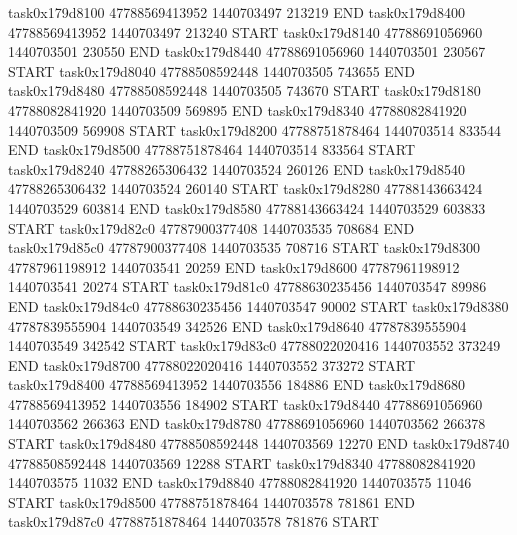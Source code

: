 task0x179d8100 47788569413952          1440703497               213219  END
task0x179d8400 47788569413952          1440703497               213240  START
task0x179d8140 47788691056960          1440703501               230550  END
task0x179d8440 47788691056960          1440703501               230567  START
task0x179d8040 47788508592448          1440703505               743655  END
task0x179d8480 47788508592448          1440703505               743670  START
task0x179d8180 47788082841920          1440703509               569895  END
task0x179d8340 47788082841920          1440703509               569908  START
task0x179d8200 47788751878464          1440703514               833544  END
task0x179d8500 47788751878464          1440703514               833564  START
task0x179d8240 47788265306432          1440703524               260126  END
task0x179d8540 47788265306432          1440703524               260140  START
task0x179d8280 47788143663424          1440703529               603814  END
task0x179d8580 47788143663424          1440703529               603833  START
task0x179d82c0 47787900377408          1440703535               708684  END
task0x179d85c0 47787900377408          1440703535               708716  START
task0x179d8300 47787961198912          1440703541                20259  END
task0x179d8600 47787961198912          1440703541                20274  START
task0x179d81c0 47788630235456          1440703547                89986  END
task0x179d84c0 47788630235456          1440703547                90002  START
task0x179d8380 47787839555904          1440703549               342526  END
task0x179d8640 47787839555904          1440703549               342542  START
task0x179d83c0 47788022020416          1440703552               373249  END
task0x179d8700 47788022020416          1440703552               373272  START
task0x179d8400 47788569413952          1440703556               184886  END
task0x179d8680 47788569413952          1440703556               184902  START
task0x179d8440 47788691056960          1440703562               266363  END
task0x179d8780 47788691056960          1440703562               266378  START
task0x179d8480 47788508592448          1440703569                12270  END
task0x179d8740 47788508592448          1440703569                12288  START
task0x179d8340 47788082841920          1440703575                11032  END
task0x179d8840 47788082841920          1440703575                11046  START
task0x179d8500 47788751878464          1440703578               781861  END
task0x179d87c0 47788751878464          1440703578               781876  START
